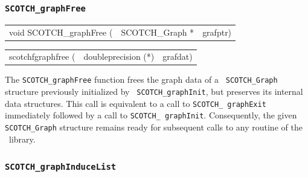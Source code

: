 \subsubsection{{\tt SCOTCH\_graphFree}}

\begin{itemize}
\progsyn

{\tt\begin{tabular}{l@{}ll}
void SCOTCH\_graphFree ( & SCOTCH\_Graph * & grafptr)
\end{tabular}}

{\tt\begin{tabular}{l@{}ll}
scotchfgraphfree ( & doubleprecision (*) & grafdat)
\end{tabular}}

\progdes

The {\tt SCOTCH\_graphFree} function frees the graph data of a {\tt
SCOTCH\_\lbt Graph} structure previously initialized by {\tt
SCOTCH\_\lbt graph\lbt Init}, but preserves its internal data
structures. This call is equivalent to a call to {\tt SCOTCH\_\lbt
graph\lbt Exit} immediately followed by a call to {\tt SCOTCH\_\lbt
graph\lbt Init}. Consequently, the given {\tt SCOTCH\_\lbt Graph}
structure remains ready for subsequent calls to any routine of the
\libscotch\ library.

\end{itemize}

\subsubsection{{\tt SCOTCH\_graphInduceList}}

